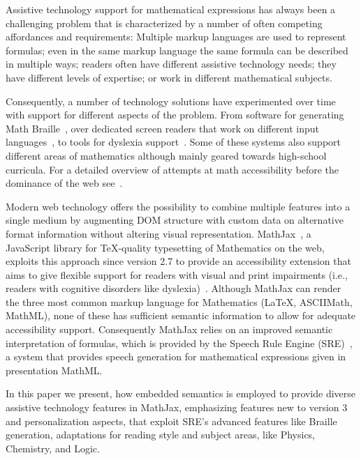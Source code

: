 \documentclass{sig-alternate}
\begin{document}
Assistive technology support for mathematical expressions has always been a
challenging problem that is characterized by a number of often competing
affordances and requirements: Multiple markup languages are used to represent
formulas; even in the same markup language the same formula can be described in
multiple ways; readers often have different assistive technology needs; they
have different levels of expertise; or work in different mathematical subjects.

Consequently, a number of technology solutions have experimented over time with
support for different aspects of the problem. From software for generating Math
Braille~\cite{maddox2007mathematical}, over dedicated screen readers that work
on different input languages~\cite{raman1994aster,soiffer2005mathplayer}, to
tools for dyslexia support~\cite{equatio}. Some of these systems also support
different areas of mathematics although mainly geared towards high-school
curricula. For a detailed overview of attempts at math accessibility before the
dominance of the web see~\cite{karshmer2007mathematics}.

Modern web technology offers the possibility to combine multiple features into a
single medium by augmenting DOM structure with custom data on alternative format
information without altering visual representation. MathJax~\cite{MathJax2.7}, a
JavaScript library for TeX-quality typesetting of Mathematics on the web,
exploits this approach since version 2.7 to provide an accessibility extension
that aims to give flexible support for readers with visual and print impairments
(i.e., readers with cognitive disorders like
dyslexia)~\cite{cervone2016towards}.  Although MathJax can render the three most
common markup language for Mathematics ({\LaTeX}, ASCIIMath, MathML), none of
these has sufficient semantic information to allow for adequate accessibility
support. Consequently MathJax relies on an improved semantic interpretation of
formulas, which is provided by the Speech Rule Engine (SRE)~\cite{SRE}, a system
that provides speech generation for mathematical expressions given in
presentation MathML.

In this paper we present, how embedded semantics is employed to provide diverse
assistive technology features in MathJax, emphasizing features new to version 3
and personalization aspects, that exploit SRE's advanced features like Braille
generation, adaptations for reading style and subject areas, like Physics,
Chemistry, and Logic.
\end{document}
